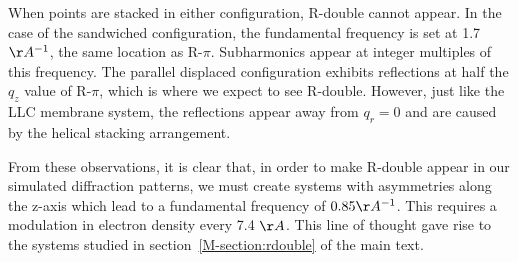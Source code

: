\documentclass[journal=jpcbfk,manusciprt=article]{achemso}
\begin{document}
  When points are stacked in either configuration, R-double cannot appear. In the case
  of the sandwiched configuration, the fundamental frequency is set at 1.7 $\AA^{-1}$,
  the same location as R-$\pi$. Subharmonics appear at integer multiples of this frequency.
  The parallel displaced configuration exhibits reflections at half the $q_z$ value of
  R-$\pi$, which is where we expect to see R-double. However, just like the LLC membrane
  system, the reflections appear away from $q_r=0$ and are caused by the helical stacking
  arrangement. 
  
  From these observations, it is clear that, in order to make R-double appear in our simulated
  diffraction patterns, we must create systems with asymmetries along the z-axis which lead to
  a fundamental frequency of $0.85 \AA^{-1}$. This requires a modulation in electron density 
  every 7.4 $\AA$. This line of thought gave rise to the systems studied in 
  section~\ref{M-section:rdouble} of the main text.
  
\end{document}
